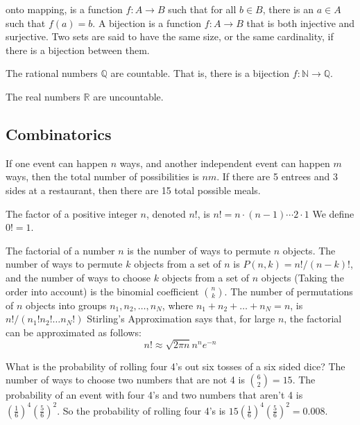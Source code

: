 \documentclass[crop=false,class=book,oneside]{standalone}
\begin{document}
        onto mapping, is a function $f:A\rightarrow{B}$
        such that for all $b\in{B}$, there is an
        $a\in{A}$ such that $f(a)=b$. A bijection is a
        function $f:A\rightarrow{B}$ that is both
        injective and surjective. Two sets are said to
        have the same size, or the same cardinality,
        if there is a bijection between them.
        \begin{theorem}
            The rational numbers $\mathbb{Q}$ are countable.
            That is, there is a bijection
            $f:\mathbb{N}\rightarrow\mathbb{Q}$.
        \end{theorem}
        \begin{theorem}
            The real numbers $\mathbb{R}$ are uncountable.
        \end{theorem}
    \subsection{Combinatorics}
        If one event can happen $n$ ways, and another independent
        event can happen $m$ ways, then the total number
        of possibilities is $nm$. If there are 5 entrees
        and 3 sides at a restaurant, then there are
        15 total possible meals.
        \begin{definition}
            The factor of a positive integer
            $n$, denoted $n!$, is
            $n!=n\cdot(n-1)\cdots{2}\cdot{1}$
            We define $0!=1$.
        \end{definition}
        The factorial of a number $n$ is the number
        of ways to permute $n$ objects. The number of ways
        to permute $k$ objects from a set of $n$ is
        $P(n,k)=n!/(n-k)!$, and the number of ways to
        choose $k$ objects from a set of $n$ objects
        (Taking the order into account) is the
        binomial coefficient $\binom{n}{k}$. The number
        of permutations of $n$ objects into groups
        $n_{1},n_{2},\hdots,n_{N}$, where
        $n_{1}+n_{2}+\hdots+n_{N}=n$, is
        $n!/(n_{1}!n_{2}!\hdots{n_{N}!})$
        Stirling's Approximation says that, for large
        $n$, the factorial can be approximated as follows:
        \begin{equation*}
            n!\approx\sqrt{2\pi{n}}n^{n}e^{-n}
        \end{equation*}
        \begin{example}
            What is the probability of rolling
            four 4's out six tosses of a six sided
            dice? The number of ways to choose
            two numbers that are not 4 is
            $\binom{6}{2}=15$. The probability of
            an event with four 4's and two numbers
            that aren't 4 is
            $(\frac{1}{6})^{4}(\frac{5}{6})^{2}$.
            So the probability of rolling four 4's is
            $15(\frac{1}{6})^{4}(\frac{5}{6})^{2}=0.008$.
        \end{example}
\end{document}
